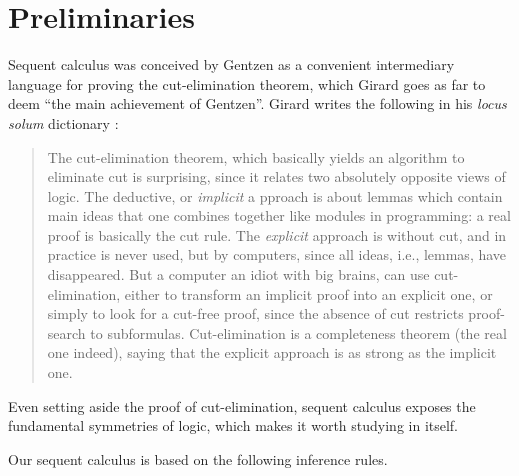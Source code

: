 


\maketitle

\section{Preliminaries}

Sequent calculus was conceived by Gentzen as a convenient intermediary language
for proving the cut-elimination theorem, which Girard \cite[pg.
106]{locus-solum} goes as far to deem ``the main achievement of Gentzen''.
Girard writes the following in his \emph{locus solum}
dictionary \cite[pg. 106]{locus-solum}:
\begin{quote}
  The cut-elimination theorem, which basically yields an algorithm to eliminate
  cut is surprising, since it relates two absolutely opposite views of logic.
  The deductive, or \emph{implicit} a pproach is about lemmas which contain
  main ideas that one combines together like modules in programming:
  a real proof is basically the cut rule. The \emph{explicit} approach is
  without cut, and in practice is never used, but by computers, since all
  ideas, i.e., lemmas, have disappeared. But a computer an idiot with big
  brains, can use cut-elimination, either to transform an implicit proof into
  an explicit one, or simply to look for a cut-free proof, since the absence
  of cut restricts proof-search to subformulas. Cut-elimination is a
  completeness theorem (the real one indeed), saying that the explicit
  approach is as strong as the implicit one.
\end{quote}

Even setting aside the proof of cut-elimination, sequent calculus exposes the
fundamental symmetries of logic, which makes it worth studying in itself.

Our sequent calculus is based on the following inference rules.

